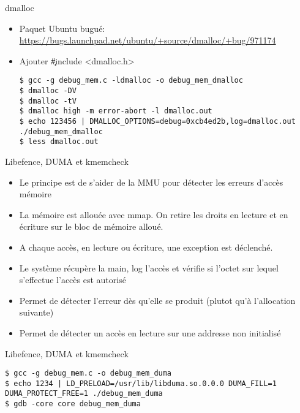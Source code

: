 \begin{frame}[fragile=singleslide]{dmalloc}
  \begin{itemize} 
  \item Paquet Ubuntu bugué: \url{https://bugs.launchpad.net/ubuntu/+source/dmalloc/+bug/971174}
  \item Ajouter \c{#include <dmalloc.h>}
  \begin{lstlisting}
$ gcc -g debug_mem.c -ldmalloc -o debug_mem_dmalloc
$ dmalloc -DV
$ dmalloc -tV
$ dmalloc high -m error-abort -l dmalloc.out
$ echo 123456 | DMALLOC_OPTIONS=debug=0xcb4ed2b,log=dmalloc.out ./debug_mem_dmalloc
$ less dmalloc.out
  \end{lstlisting}
  \end{itemize}
\end{frame}

\begin{frame}[fragile=singleslide]{Libefence, DUMA et kmemcheck}
  \begin{itemize}
  \item Le principe est de s'aider de la MMU pour détecter les erreurs
    d'accès mémoire
  \item  La mémoire est  allouée avec  mmap. On  retire les  droits en
    lecture et en écriture sur le bloc de mémoire alloué.
  \item  A chaque  accès, en  lecture ou  écriture, une  exception est
    déclenché.
  \item Le système récupère la main, log l'accès et vérifie si l'octet
    sur lequel s'effectue l'accès est autorisé
  \item  Permet de détecter  l'erreur dès  qu'elle se  produit (plutot
    qu'à l'allocation suivante)
  \item Permet  de détecter un accès  en lecture sur  une addresse non
    initialisé
  \end{itemize}
\end{frame}

\begin{frame}[fragile=singleslide]{Libefence, DUMA et kmemcheck}
  \begin{lstlisting}
$ gcc -g debug_mem.c -o debug_mem_duma
$ echo 1234 | LD_PRELOAD=/usr/lib/libduma.so.0.0.0 DUMA_FILL=1 DUMA_PROTECT_FREE=1 ./debug_mem_duma
$ gdb -core core debug_mem_duma
  \end{lstlisting}
\end{frame}

